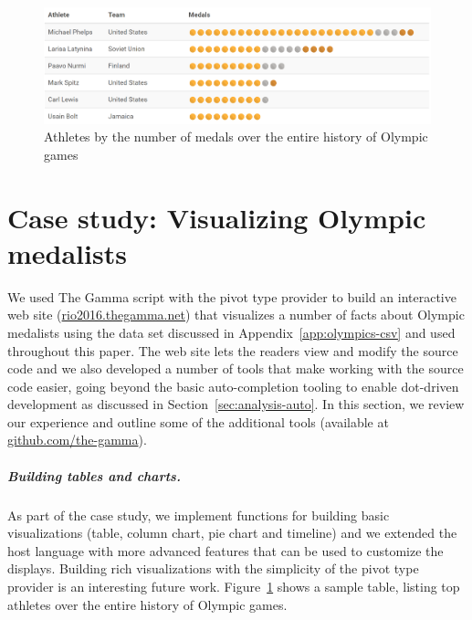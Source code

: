 \documentclass[a4paper,UKenglish]{lipics-v2016}
\theoremstyle{plain}
\theoremstyle{definition}
\begin{document}

\begin{figure}[b]
\begin{center}
\includegraphics[scale=0.30,trim=0mm 0mm 0mm 0mm,clip]{images/table.png} %
\end{center}
\caption{Athletes by the number of medals over the entire history of Olympic games}
\label{fig:case-table}
\end{figure}


\section{Case study: Visualizing Olympic medalists}
\label{sec:impl}

We used The Gamma script with the pivot type provider to build an interactive web site 
(\url{rio2016.thegamma.net}) that visualizes a number of facts about Olympic medalists 
using the data set discussed in Appendix~\ref{app:olympics-csv} and used throughout this paper.
The web site lets the readers view and modify the source code and we also developed a number of
tools that make working with the source code easier, going beyond the basic auto-completion tooling
to enable dot-driven development as discussed in Section~\ref{sec:analysis-auto}. In this section,
we review our experience and outline some of the additional tools (available at 
\url{github.com/the-gamma}).

\subparagraph{Building tables and charts.} 
As part of the case study, we implement functions for building basic visualizations 
(table, column chart, pie chart and timeline) and we extended the host language with more advanced 
features that can be used to customize the displays. Building rich visualizations with the 
simplicity of the pivot type provider is an interesting future work. Figure~\ref{fig:case-table} 
shows a sample table, listing top athletes over the entire history of Olympic games.
\end{document}
